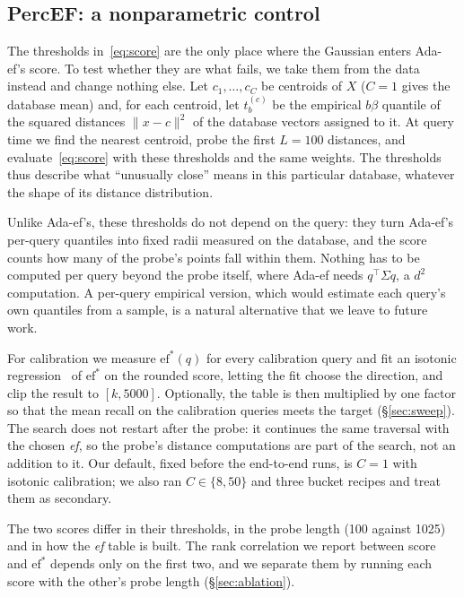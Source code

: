 \documentclass[sigconf,review=false,screen]{acmart}
\newcommand{\ef}{\textit{ef}}
\begin{document}
\subsection{PercEF: a nonparametric control}

The thresholds in~\eqref{eq:score} are the only place where the Gaussian enters Ada-ef's score.
To test whether they are what fails, we take them from the data instead and change nothing else. Let $c_1,\dots,c_C$ be centroids of $X$ ($C = 1$ gives the
database mean) and, for each centroid, let $t^{(c)}_b$ be the empirical $b\beta$ quantile of the
squared distances $\lVert x - c \rVert^2$ of the database vectors assigned to it. At query time we
find the nearest centroid, probe the first $L = 100$ distances, and evaluate~\eqref{eq:score} with
these thresholds and the same weights. The thresholds thus describe what ``unusually close'' means
in this particular database, whatever the shape of its distance distribution.

Unlike Ada-ef's, these thresholds do not depend on the query: they turn Ada-ef's per-query
quantiles into fixed radii measured on the database, and the score counts how many of the probe's
points fall within them. Nothing has to be computed per query beyond the probe itself, where Ada-ef
needs $q^\top\Sigma q$, a $d^2$ computation. A per-query empirical version, which would estimate each
query's own quantiles from a sample, is a natural alternative that we leave to future work.

For calibration we measure $\mathrm{ef}^*(q)$ for every calibration query and fit an isotonic
regression~\cite{barlow1972isotonic} of $\mathrm{ef}^*$ on the rounded score, letting the fit
choose the direction, and clip the result to $[k, 5000]$. Optionally, the table is then multiplied by
one factor so that the mean recall on the calibration queries meets the target (\S\ref{sec:sweep}). The search does not restart after the
probe: it continues the same traversal with the chosen \ef{}, so the probe's distance computations
are part of the search, not an addition to it. Our default, fixed before the end-to-end runs, is
$C = 1$ with isotonic calibration; we also ran $C \in \{8, 50\}$ and three bucket recipes and treat
them as secondary.

The two scores differ in their thresholds, in the probe length (100 against 1025) and in how the
\ef{} table is built. The rank correlation we report between score and $\mathrm{ef}^*$ depends only
on the first two, and we separate them by running each score with the other's probe length
(\S\ref{sec:ablation}).
\end{document}
